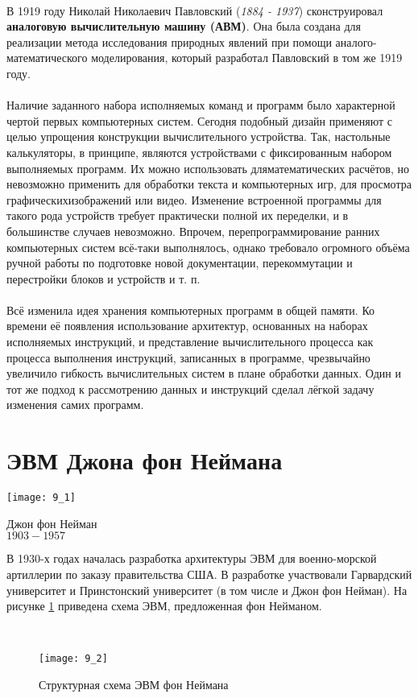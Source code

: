 \\В 1919 году Николай Николаевич Павловский (\emph{1884 - 1937}) сконструировал \textbf{аналоговую вычислительную машину (АВМ)}. Она была создана для реализации метода исследования природных явлений при помощи аналого-математического моделирования, который разработал Павловский в том же 1919 году.
\\\\Наличие заданного набора исполняемых команд и программ было характерной чертой первых компьютерных систем. Сегодня подобный дизайн применяют с целью упрощения конструкции вычислительного устройства. Так, настольные калькуляторы, в принципе, являются устройствами с фиксированным набором выполняемых программ. Их можно использовать дляматематических расчётов, но невозможно применить для обработки текста и компьютерных игр, для просмотра графическихизображений или видео. Изменение встроенной программы для такого рода устройств требует практически полной их переделки, и в большинстве случаев невозможно. Впрочем, перепрограммирование ранних компьютерных систем всё-таки выполнялось, однако требовало огромного объёма ручной работы по подготовке новой документации, перекоммутации и перестройки блоков и устройств и т. п.
\\\\Всё изменила идея хранения компьютерных программ в общей памяти. Ко времени её появления использование архитектур, основанных на наборах исполняемых инструкций, и представление вычислительного процесса как процесса выполнения инструкций, записанных в программе, чрезвычайно увеличило гибкость вычислительных систем в плане обработки данных. Один и тот же подход к рассмотрению данных и инструкций сделал лёгкой задачу изменения самих программ.

\section{ЭВМ Джона фон Неймана}
\begin{minipage}[l]{3cm}
\texttt{[image: 9\_1]}
\begin{center}
\footnotesize{Джон фон Нейман}
\\\footnotesize{$1903 - 1957$}
\end{center}
\end{minipage}
\hfill
\begin{minipage}[r]{7.5cm}
В 1930-х годах началась разработка архитектуры ЭВМ для военно-морской артиллерии по заказу правительства США. В разработке участвовали Гарвардский университет и Принстонский университет (в том числе и Джон фон Нейман). На рисунке \ref{tag:EVM_von_Neumann} приведена схема ЭВМ, предложенная фон Нейманом.
\end{minipage}
\\
\begin{figure}[h]
\texttt{[image: 9\_2]}
\caption{Структурная схема ЭВМ фон Неймана}
\label{tag:EVM_von_Neumann}
\end{figure}
